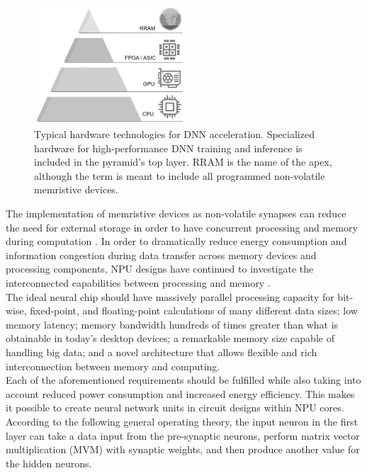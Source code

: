 \begin{figure}[htbp!] 
\centering    
\includegraphics[width=0.5\textwidth]{Chapter1/Figs/1l.png}
\caption[Typical hardware technologies for DNN acceleration.]{Typical hardware technologies for DNN acceleration. Specialized hardware for high-performance DNN training and inference is included in the pyramid's top layer. RRAM is the name of the apex, although the term is meant to include all programmed non-volatile memristive devices.}
\label{fig:1l}
\end{figure}


\noindent The implementation of memristive devices as non-volatile synapses can reduce the need for external storage in order to have concurrent processing and memory during computation \cite{kim2015exploiting}. In order to dramatically reduce energy consumption and information congestion during data transfer across memory devices and processing components, NPU designs have continued to investigate the interconnected capabilities between processing and memory \cite{lee2013rmss}.\\

\noindent The ideal neural chip should have massively parallel processing capacity for bit-wise, fixed-point, and floating-point calculations of many different data sizes; low memory latency; memory bandwidth hundreds of times greater than what is obtainable in today's desktop devices; a remarkable memory size capable of handling big data; and a novel architecture that allows flexible and rich interconnection between memory and computing. \\

\noindent Each of the aforementioned requirements should be fulfilled while also taking into account reduced power consumption and increased energy efficiency. This makes it possible to create neural network units in circuit designs within NPU cores. According to the following general operating theory, the input neuron in the first layer can take a data input from the pre-synaptic neurons, perform matrix vector multiplication (MVM) with synaptic weights, and then produce another value for the hidden neurons. \\


